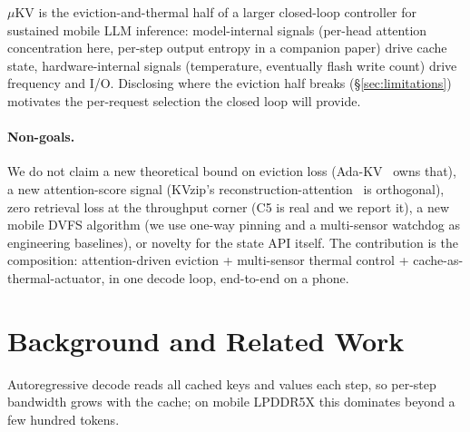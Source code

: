 \documentclass[sigconf, anonymous=false, screen=true]{acmart}
\begin{document}
$\mu$KV is the eviction-and-thermal half of a larger closed-loop controller for sustained mobile LLM inference: model-internal signals (per-head attention concentration here, per-step output entropy in a companion paper) drive cache state, hardware-internal signals (temperature, eventually flash write count) drive frequency and I/O. Disclosing where the eviction half breaks (\S\ref{sec:limitations}) motivates the per-request selection the closed loop will provide.

\paragraph{Non-goals.} We do not claim a new theoretical bound on eviction loss (Ada-KV~\cite{feng2025adakv} owns that), a new attention-score signal (KVzip's reconstruction-attention~\cite{kim2025kvzip} is orthogonal), zero retrieval loss at the throughput corner (C5 is real and we report it), a new mobile DVFS algorithm (we use one-way pinning and a multi-sensor watchdog as engineering baselines), or novelty for the state API itself. The contribution is the composition: attention-driven eviction + multi-sensor thermal control + cache-as-thermal-actuator, in one decode loop, end-to-end on a phone.

\section{Background and Related Work}
\label{sec:bg}

Autoregressive decode reads all cached keys and values each step, so per-step bandwidth grows with the cache; on mobile LPDDR5X this dominates beyond a few hundred tokens.
\end{document}

